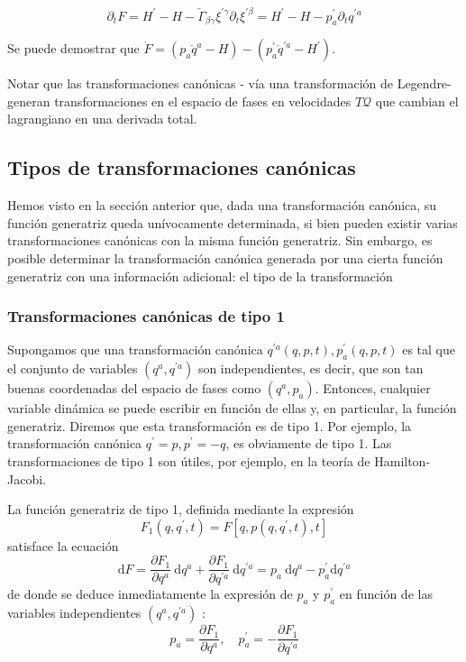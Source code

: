 \begin{equation*}
\partial_{t} F=H^{\prime}-H-\check{\Gamma}_{\beta \gamma} \xi^{\prime \gamma} \partial_{t} \xi^{\prime \beta}=H^{\prime}-H-p_{a}^{\prime} \partial_{t} q^{\prime a} \tag{2.11}
\end{equation*}

 Se puede demostrar que $\dot{F}=\left(p_{a} \dot{q}^{a}-H\right)-\left(p_{a}^{\prime} \dot{q}^{\prime a}-H^{\prime}\right)$. 
 
 Notar que las transformaciones canónicas - vía una transformación de Legendre- generan transformaciones en el espacio de fases en velocidades $T \mathscr{Q}$ que cambian el lagrangiano en una derivada total.
\subsection{Tipos de transformaciones canónicas}
Hemos visto en la sección anterior que, dada una transformación canónica, su función generatriz queda unívocamente determinada, si bien pueden existir varias transformaciones canónicas con la misma función generatriz. Sin embargo, es posible determinar la transformación canónica generada por una cierta función generatriz con una información adicional: el tipo de la transformación
\subsubsection{Transformaciones canónicas de tipo 1}
Supongamos que una transformación canónica $q^{\prime a}(q, p, t), p_{a}^{\prime}(q, p, t)$ es tal que el conjunto de variables $\left(q^{a}, q^{\prime a}\right)$ son independientes, es decir, que son tan buenas coordenadas del espacio de fases como $\left(q^{a}, p_{a}\right)$. Entonces, cualquier variable dinámica se puede escribir en función de ellas y, en particular, la función generatriz. Diremos que esta transformación es de tipo 1. Por ejemplo, la transformación canónica $q^{\prime}=p, p^{\prime}=-q$, es obviamente de tipo 1. Las transformaciones de tipo 1 son útiles, por ejemplo, en la teoría de Hamilton-Jacobi.

La función generatriz de tipo 1, definida mediante la expresión
$$
F_{1}\left(q, q^{\prime}, t\right)=F\left[q, p\left(q, q^{\prime}, t\right), t\right]
$$
satisface la ecuación
$$
\mathrm{d} F=\frac{\partial F_{1}}{\partial q^{a}} \mathrm{~d} q^{a}+\frac{\partial F_{1}}{\partial q^{\prime a}} \mathrm{~d} q^{\prime a}=p_{a} \mathrm{~d} q^{a}-p_{a}^{\prime} \mathrm{d} q^{\prime a}
$$
de donde se deduce inmediatamente la expresión de $p_{a}$ y $p_{a}^{\prime}$ en función de las variables independientes $\left(q^{a}, q^{\prime a}\right)$ :
$$
\begin{equation*}
p_{a}=\frac{\partial F_{1}}{\partial q^{a}}, \quad p_{a}^{\prime}=-\frac{\partial F_{1}}{\partial q^{\prime a}} \tag{2.12}
\end{equation*}
$$

